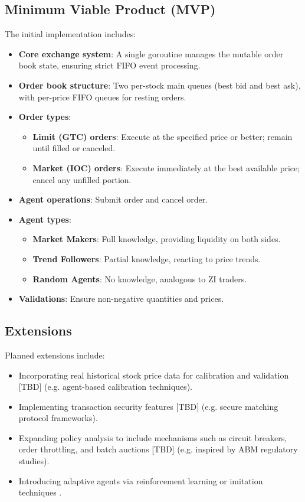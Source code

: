 \documentclass[conference, 12pt]{IEEEtran}
\begin{document}
\subsection{Minimum Viable Product (MVP)}
The initial implementation includes:
\begin{itemize}
  \item \textbf{Core exchange system}: A single goroutine manages the mutable order book state, ensuring strict FIFO event processing.
  \item \textbf{Order book structure}: Two per-stock main queues (best bid and best ask), with per-price FIFO queues for resting orders.
  \item \textbf{Order types}:
    \begin{itemize}
      \item \textbf{Limit (GTC) orders}: Execute at the specified price or better; remain until filled or canceled.
      \item \textbf{Market (IOC) orders}: Execute immediately at the best available price; cancel any unfilled portion.
    \end{itemize}
  \item \textbf{Agent operations}: Submit order and cancel order.
  \item \textbf{Agent types}:
    \begin{itemize}
      \item \textbf{Market Makers}: Full knowledge, providing liquidity on both sides.
      \item \textbf{Trend Followers}: Partial knowledge, reacting to price trends.
      \item \textbf{Random Agents}: No knowledge, analogous to ZI traders.
    \end{itemize}
  \item \textbf{Validations}: Ensure non-negative quantities and prices.
\end{itemize}

\subsection{Extensions}
Planned extensions include:
\begin{itemize}
  \item Incorporating real historical stock price data for calibration and validation [TBD] (e.g. agent-based calibration techniques).
  \item Implementing transaction security features [TBD] (e.g. secure matching protocol frameworks).
  \item Expanding policy analysis to include mechanisms such as circuit breakers, order throttling, and batch auctions [TBD] (e.g. inspired by ABM regulatory studies).
  \item Introducing adaptive agents via reinforcement learning or imitation techniques \cite{mahfouz2021learning, beysolow2019market}.
\end{itemize}
\end{document}
